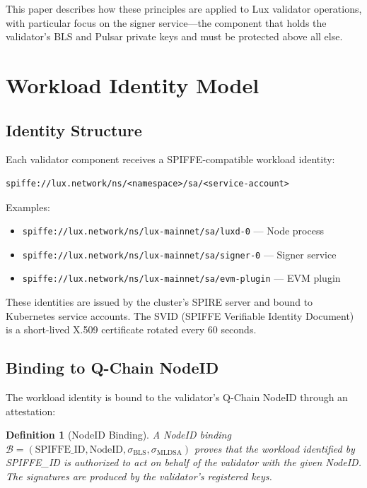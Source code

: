 \documentclass[11pt]{article}
\newtheorem{definition}{Definition}
\begin{document}
This paper describes how these principles are applied to Lux validator operations, with particular focus on the signer service---the component that holds the validator's BLS and Pulsar private keys and must be protected above all else.

\section{Workload Identity Model}

\subsection{Identity Structure}

Each validator component receives a SPIFFE-compatible workload identity:

\begin{verbatim}
spiffe://lux.network/ns/<namespace>/sa/<service-account>
\end{verbatim}

Examples:
\begin{itemize}
\item \texttt{spiffe://lux.network/ns/lux-mainnet/sa/luxd-0} --- Node process
\item \texttt{spiffe://lux.network/ns/lux-mainnet/sa/signer-0} --- Signer service
\item \texttt{spiffe://lux.network/ns/lux-mainnet/sa/evm-plugin} --- EVM plugin
\end{itemize}

These identities are issued by the cluster's SPIRE server and bound to Kubernetes service accounts. The SVID (SPIFFE Verifiable Identity Document) is a short-lived X.509 certificate rotated every 60 seconds.

\subsection{Binding to Q-Chain NodeID}

The workload identity is bound to the validator's Q-Chain NodeID through an attestation:

\begin{definition}[NodeID Binding]
A NodeID binding $\mathcal{B} = (\text{SPIFFE\_ID}, \text{NodeID}, \sigma_{\text{BLS}}, \sigma_{\text{MLDSA}})$ proves that the workload identified by SPIFFE\_ID is authorized to act on behalf of the validator with the given NodeID. The signatures are produced by the validator's registered keys.
\end{definition}
\end{document}
